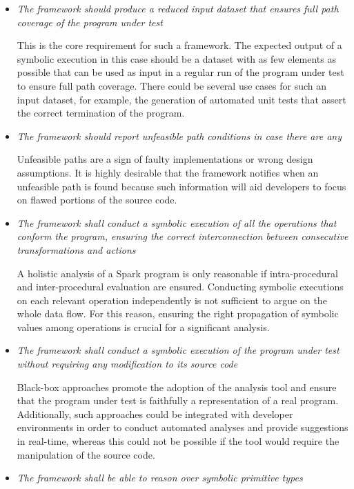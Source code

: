 \newcommand{\reqitem}[1]{\item[\textit{\textbf{R.#1}}]}
\begin{itemize}
\reqitem{1} \textit{The framework should produce a reduced input dataset that ensures full path coverage of the program under test}

This is the core requirement for such a framework. The expected output of a symbolic execution in this case should be a dataset with as few elements as possible that can be used as input in a regular run of the program under test to ensure full path coverage. There could be several use cases for such an input dataset, for example, the generation of automated unit tests that assert the correct termination of the program.

\reqitem{2} \textit{The framework should report unfeasible path conditions in case there are any}

Unfeasible paths are a sign of faulty implementations or wrong design assumptions. It is highly desirable that the framework notifies when an unfeasible path is found because such information will aid developers to focus on flawed portions of the source code.

\reqitem{3} \textit{The framework shall conduct a symbolic execution of all the operations that conform the program, ensuring the correct interconnection between consecutive transformations and actions}

A holistic analysis of a Spark program is only reasonable if intra-procedural and inter-procedural evaluation are ensured. Conducting symbolic executions on each relevant operation independently is not sufficient to argue on the whole data flow. For this reason, ensuring the right propagation of symbolic values among operations is crucial for a significant analysis.
	
\reqitem{4} \textit{The framework shall conduct a symbolic execution of the program under test without requiring any modification to its source code}

Black-box approaches promote the adoption of the analysis tool and ensure that the program under test is faithfully a representation of a real program. Additionally, such approaches could be integrated with developer environments in order to conduct automated analyses and provide suggestions in real-time, whereas this could not be possible if the tool would require the manipulation of the source code. 
	
\reqitem{5} \textit{The framework shall be able to reason over symbolic primitive types}


\end{itemize}
